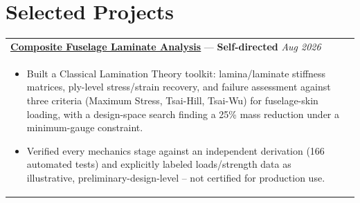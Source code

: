 \documentclass[a4paper,8pt]{article}
\newcommand{\ulhref}[2]{%
  {\hypersetup{urlcolor=.}\textcolor{.}{\href{#1}{\uline{#2}}}}%
}
\begin{document}
%

\section{Selected Projects}

\begin{tabularx}{\linewidth}{ @{}l r@{} }
\textbf{\ulhref{https://github.com/Sanjanakamboj/composite-fuselage-laminate-analysis}{Composite Fuselage Laminate Analysis}} — \color[HTML]{371e77}\textbf{Self-directed} \hfill \textit{Aug 2026}\\[1pt]
\begin{minipage}[t]{\linewidth}
    \begin{itemize}[nosep,after=\strut, leftmargin=*, itemsep=1pt]
        \item Built a Classical Lamination Theory toolkit: lamina/laminate stiffness matrices, ply-level stress/strain recovery, and failure assessment against three criteria (Maximum Stress, Tsai-Hill, Tsai-Wu) for fuselage-skin loading, with a design-space search finding a 25\% mass reduction under a minimum-gauge constraint.
        \item Verified every mechanics stage against an independent derivation (166 automated tests) and explicitly labeled loads/strength data as illustrative, preliminary-design-level -- not certified for production use.
    \end{itemize}
\end{minipage}
\end{tabularx}
\end{document}
